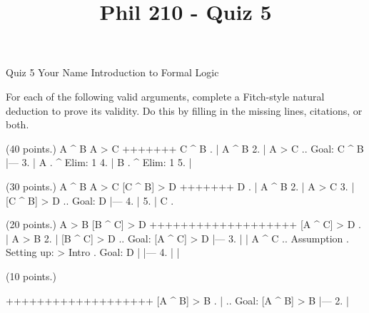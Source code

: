 
\title{Phil 210 - Quiz 5}

\heading
Quiz 5
Your Name
Introduction to Formal Logic
\endheading

For each of the following valid arguments, complete a Fitch-style natural deduction to prove its validity. Do this by filling in the missing lines, citations, or both.

\problems
{} (40 points.)
\argument
 A ^ B
 A > C
+++++++
 C ^ B
\endargument
        \answer
        . | A ^ B
         2. | A > C  ..  Goal: C ^ B
            |---
         3. | A      .  ^ Elim: 1
         4. | B      .  ^ Elim: 1
         5. | 
        \endfitchproof
        \endanswer

 (30 points.)
\argument
 A ^ B
 A > C
 [C ^ B] > D
+++++++
 D
\endargument
        \answer
        . | A ^ B
         2. | A > C
         3. | [C ^ B] > D  ..  Goal: D
            |---
         4. | 
         5. | C      .  
        \endfitchproof
        \endanswer

 (20 points.)
\argument
 A > B
 [B ^ C] > D
+++++++++++++++++++
 [A ^ C] > D
\endargument
        \answer
        . | A > B
         2. | [B ^ C] > D  ..  Goal: [A ^ C] > D
            |---
         3. |   | A ^ C    ..  Assumption  .  Setting up: > Intro  .  Goal: D
            |   |---
         4. |   | 
        \endfitchproof
        \endanswer

 (10 points.)
\argument

+++++++++++++++++++
 [A ^ B] > B
\endargument
        \answer
        . |            ..  Goal: [A ^ B] > B
            |---
         2. | 
        \endfitchproof
        \endanswer

\endproblems
\bye
